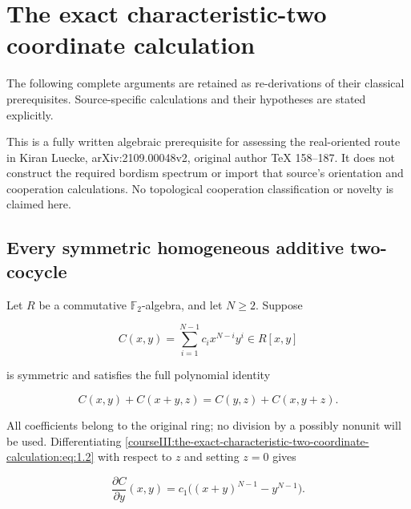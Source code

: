 \section{The exact characteristic-two coordinate calculation}\label{courseIII:the-exact-characteristic-two-coordinate-calculation:section}

The following complete arguments are retained as re-derivations of their classical prerequisites. Source-specific calculations and their hypotheses are stated explicitly.

This is a fully written algebraic prerequisite for assessing the real-oriented route in Kiran Luecke, arXiv:2109.00048v2, original author TeX 158--187. It does not construct the required bordism spectrum or import that source's orientation and cooperation calculations. No topological cooperation classification or novelty is claimed here.

\subsection{Every symmetric homogeneous additive two-cocycle}
\label{courseIII:the-exact-characteristic-two-coordinate-calculation:formal-two-cocycles}

\label{courseIII:the-exact-characteristic-two-coordinate-calculation:section-1}\label{courseIII:formal-char2:1}

Let \(R\) be a commutative \(\mathbb F_2\)-algebra, and let \(N\geq2\). Suppose

\begin{equation}
C(x,y)=\sum_{i=1}^{N-1}c_i x^{N-i}y^i\in R[x,y]
 \label{courseIII:the-exact-characteristic-two-coordinate-calculation:eq:1.1}
\end{equation}

is symmetric and satisfies the full polynomial identity

\begin{equation}
C(x,y)+C(x+y,z)=C(y,z)+C(x,y+z).
 \label{courseIII:the-exact-characteristic-two-coordinate-calculation:eq:1.2}
\end{equation}

All coefficients belong to the original ring; no division by a possibly nonunit will be used. Differentiating \eqref{courseIII:the-exact-characteristic-two-coordinate-calculation:eq:1.2} with respect to \(z\) and setting \(z=0\) gives

\begin{equation}
\frac{\partial C}{\partial y}(x,y)
   =c_1\bigl((x+y)^{N-1}-y^{N-1}\bigr).
 \label{courseIII:the-exact-characteristic-two-coordinate-calculation:eq:1.3}
\end{equation}

